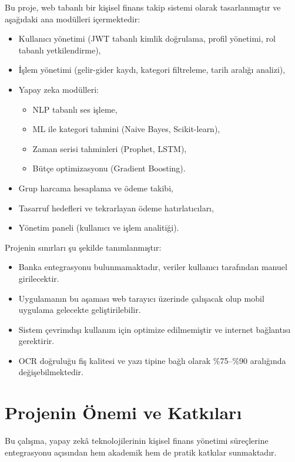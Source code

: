 Bu proje, web tabanlı bir kişisel finans takip sistemi olarak tasarlanmıştır ve aşağıdaki ana modülleri içermektedir:

\begin{itemize}
    \item Kullanıcı yönetimi (JWT tabanlı kimlik doğrulama, profil yönetimi, rol tabanlı yetkilendirme),
    \item İşlem yönetimi (gelir-gider kaydı, kategori filtreleme, tarih aralığı analizi),
    \item Yapay zeka modülleri:
    \begin{itemize}
        \item NLP tabanlı ses işleme,
        \item ML ile kategori tahmini (Naive Bayes, Scikit-learn),
        \item Zaman serisi tahminleri (Prophet, LSTM),
        \item Bütçe optimizasyonu (Gradient Boosting).
    \end{itemize}
    \item Grup harcama hesaplama ve ödeme takibi,
    \item Tasarruf hedefleri ve tekrarlayan ödeme hatırlatıcıları,
    \item Yönetim paneli (kullanıcı ve işlem analitiği).
\end{itemize}

Projenin sınırları şu şekilde tanımlanmıştır:

\begin{itemize}
    \item Banka entegrasyonu bulunmamaktadır, veriler kullanıcı tarafından manuel girilecektir.
    \item Uygulamanın bu aşaması web tarayıcı üzerinde çalışacak olup mobil uygulama gelecekte geliştirilebilir.
    \item Sistem çevrimdışı kullanım için optimize edilmemiştir ve internet bağlantısı gerektirir.
    \item OCR doğruluğu fiş kalitesi ve yazı tipine bağlı olarak \%75--\%90 aralığında değişebilmektedir.
\end{itemize}

\section{Projenin Önemi ve Katkıları}

Bu çalışma, yapay zekâ teknolojilerinin kişisel finans yönetimi süreçlerine entegrasyonu açısından hem akademik hem de pratik katkılar sunmaktadır.

